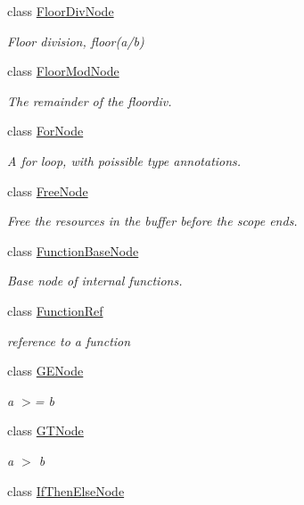 \begin{DoxyCompactItemize}
class \hyperlink{classtvm_1_1tir_1_1FloorDivNode}{Floor\+Div\+Node}
\begin{DoxyCompactList}\small\item\em Floor division, floor(a/b) \end{DoxyCompactList}\item 
class \hyperlink{classtvm_1_1tir_1_1FloorModNode}{Floor\+Mod\+Node}
\begin{DoxyCompactList}\small\item\em The remainder of the floordiv. \end{DoxyCompactList}\item 
class \hyperlink{classtvm_1_1tir_1_1ForNode}{For\+Node}
\begin{DoxyCompactList}\small\item\em A for loop, with poissible type annotations. \end{DoxyCompactList}\item 
class \hyperlink{classtvm_1_1tir_1_1FreeNode}{Free\+Node}
\begin{DoxyCompactList}\small\item\em Free the resources in the buffer before the scope ends. \end{DoxyCompactList}\item 
class \hyperlink{classtvm_1_1tir_1_1FunctionBaseNode}{Function\+Base\+Node}
\begin{DoxyCompactList}\small\item\em Base node of internal functions. \end{DoxyCompactList}\item 
class \hyperlink{classtvm_1_1tir_1_1FunctionRef}{Function\+Ref}
\begin{DoxyCompactList}\small\item\em reference to a function \end{DoxyCompactList}\item 
class \hyperlink{classtvm_1_1tir_1_1GENode}{G\+E\+Node}
\begin{DoxyCompactList}\small\item\em a $>$= b \end{DoxyCompactList}\item 
class \hyperlink{classtvm_1_1tir_1_1GTNode}{G\+T\+Node}
\begin{DoxyCompactList}\small\item\em a $>$ b \end{DoxyCompactList}\item 
class \hyperlink{classtvm_1_1tir_1_1IfThenElseNode}{If\+Then\+Else\+Node}

\end{DoxyCompactItemize}
